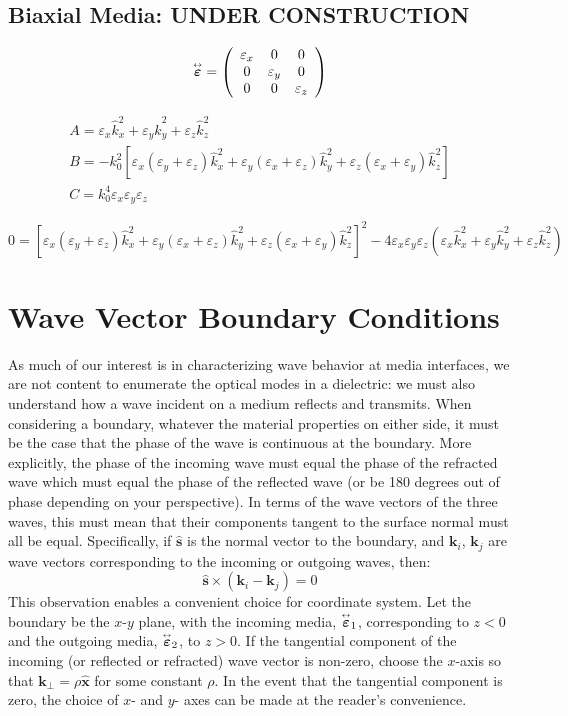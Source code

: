 \documentclass[11pt, reqno]{book}%
\newcounter{ct}
\newcommand{\es}{\begin{equation}}
\newcommand{\ef}{\end{equation} \vspace{0.05in}}
\newcommand{\mbf}{\mathbf}
\newcommand{\mbfg}[1]{\mbf{\mbox{\boldmath$#1$}}}
\newcommand{\mbfh}[1]{\hat{\mbf{#1}}}
\newcommand{\ve}{\varepsilon}
\newcommand{\tens}{\overset{\text{\tiny$\leftrightarrow$}}}
\newcommand{\clr}{\color{blue}}
\newcommand{\clb}{\color{black}}
\begin{document}
\clb
\clr
\subsection{Biaxial Media: UNDER CONSTRUCTION}
\label{sec:bimedia}


\es
\tens{\mbfg{\ve}}=
\left(\begin{array}{ccc}
\ve_x & 0 & 0 \\
0 & \ve_y & 0 \\
0 & 0 &\ve_z
\end{array}\right)
\ef

\es
\begin{array}{l}
A = \ve_x \hat{k}^2_x +\ve_y \hat{k}^2_y +\ve_z \hat{k}^2_z \\
B = -k^2_0 \left[ \ve_x\left(\ve_y+\ve_z\right)\hat{k}^2_x + \ve_y\left(\ve_x+\ve_z\right)\hat{k}^2_y +\ve_z\left(\ve_x+\ve_y\right)\hat{k}^2_z  \right] \\
C= k^4_0\ve_x \ve_y \ve_z
\end{array}
\ef

\es
0= \left[\ve_x\left(\ve_y+\ve_z\right)\hat{k}^2_x + \ve_y\left(\ve_x+\ve_z\right)\hat{k}^2_y +\ve_z\left(\ve_x+\ve_y\right)\hat{k}^2_z  \right]^2 - 4 \ve_x\ve_y \ve_z \left( \ve_x \hat{k}^2_x +\ve_y \hat{k}^2_y +\ve_z \hat{k}^2_z \right)
\ef



\clb

\section{Wave Vector Boundary Conditions}
\label{sec:kboundary}

As much of our interest is in characterizing wave behavior at media interfaces, we are not content to enumerate the optical modes in a dielectric: we must also understand how a wave incident on a medium reflects and transmits. When considering a boundary, whatever the material properties on either side, it must be the case that the phase of the wave is continuous at the boundary. More explicitly, the phase of the incoming wave must equal the phase of the refracted wave which must equal the phase of the reflected wave (or be 180 degrees out of phase depending on your perspective). In terms of the wave vectors of the three waves, this must mean that their components tangent to the surface normal must all be equal. Specifically, if $\mbfh{s}$ is the normal vector to the boundary, and $\mbf{k}_i$, $\mbf{k}_j$ are wave vectors corresponding to the incoming or outgoing waves, then:
\es
\mbfh{s}\times(\mbf{k}_i-\mbf{k}_j) =0
\ef
\noindent This observation enables a convenient choice for coordinate system. Let the boundary be the $x$-$y$ plane, with the incoming media, $\tens{\mbfg{\ve}}_1$, corresponding to $z<0$ and the outgoing media, $\tens{\mbfg{\ve}}_2$, to $z>0$. If the tangential component of the incoming (or reflected or refracted) wave vector is non-zero, choose the $x$-axis so that $\mbf{k}_\perp = \rho \mbfh{x}$ for some constant $\rho$. In the event that the tangential component is zero, the choice of $x$- and $y$- axes can be made at the reader's convenience.  
\end{document}
